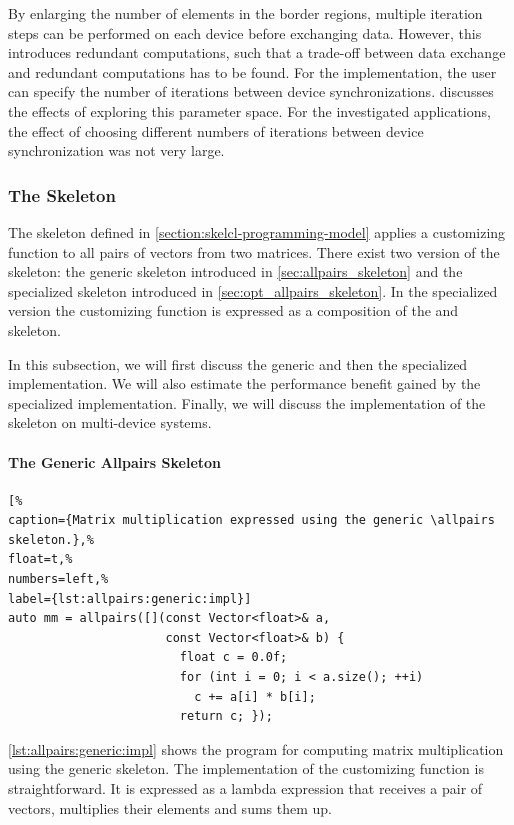 By enlarging the number of elements in the border regions, multiple iteration steps can be performed on each device before exchanging data.
However, this introduces redundant computations, such that a trade-off between data exchange and redundant computations has to be found.
For the  implementation, the user can specify the number of iterations between device synchronizations.
\cite{Breuer2014} discusses the effects of exploring this parameter space.
For the investigated applications, the effect of choosing different numbers of iterations between device synchronization was not very large.


\subsubsection{The \allpairs Skeleton}
The \allpairs skeleton defined in \autoref{section:skelcl-programming-model} applies a customizing function to all pairs of vectors from two matrices.
There exist two version of the skeleton: the generic \allpairs skeleton introduced in \autoref{sec:allpairs_skeleton} and the specialized \allpairs skeleton introduced in \autoref{sec:opt_allpairs_skeleton}.
In the specialized version the customizing function is expressed as a composition of the \zip and \reduce skeleton.

In this subsection, we will first discuss the generic and then the specialized implementation.
We will also estimate the performance benefit gained by the specialized implementation.
Finally, we will discuss the implementation of the \allpairs skeleton on multi-device systems.

\paragraph{The Generic Allpairs Skeleton}
\begin{lstlisting}[%
caption={Matrix multiplication expressed using the generic \allpairs skeleton.},%
float=t,%
numbers=left,%
label={lst:allpairs:generic:impl}]
auto mm = allpairs([](const Vector<float>& a,
                      const Vector<float>& b) {
                        float c = 0.0f;
                        for (int i = 0; i < a.size(); ++i)
                          c += a[i] * b[i];
                        return c; });
\end{lstlisting}

\autoref{lst:allpairs:generic:impl} shows the program for computing matrix multiplication using the generic \allpairs skeleton.
The implementation of the customizing function is straightforward.
It is expressed as a lambda expression that receives a pair of vectors, multiplies their elements and sums them up.

